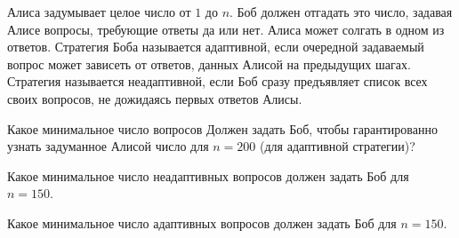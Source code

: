 Алиса задумывает целое число от $1$ до $n$. Боб должен отгадать это число, задавая Алисе вопросы, требующие ответы да или
нет. Алиса может солгать в одном из ответов. Стратегия Боба называется адаптивной, если очередной задаваемый вопрос может
зависеть от ответов, данных Алисой на предыдущих шагах. Стратегия называется неадаптивной, если Боб сразу предъявляет список
всех своих вопросов, не дожидаясь первых ответов Алисы.
\begin{enumcyr}
    \item Какое минимальное число вопросов Должен задать Боб, чтобы гарантированно узнать задуманное Алисой число для $n =
	    200$ (для адаптивной стратегии)?
    \item Какое минимальное число неадаптивных вопросов должен задать Боб для $n = 150$.
    \item Какое минимальное число адаптивных вопросов должен задать Боб для $n = 150$.
\end{enumcyr}